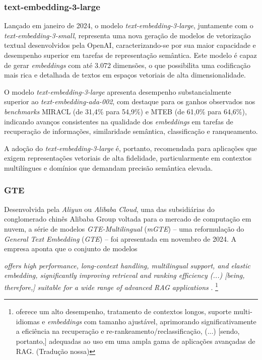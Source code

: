 \subsubsection{text-embedding-3-large}
\label{subsubsec:Metodologia.2.1.3}

Lançado em janeiro de 2024, o modelo \textit{text-embedding-3-large}, juntamente com o \textit{text-embedding-3-small}, representa uma nova geração de modelos de vetorização textual desenvolvidos pela OpenAI, caracterizando-se por sua maior capacidade e desempenho superior em tarefas de representação semântica. Este modelo é capaz de gerar \textit{embeddings} com até 3.072 dimensões, o que possibilita uma codificação mais rica e detalhada de textos em espaços vetoriais de alta dimensionalidade.

O modelo \textit{text-embedding-3-large} apresenta desempenho substancialmente superior ao \textit{text-embedding-ada-002}, com destaque para os ganhos observados nos \textit{benchmarks} MIRACL (de 31,4\% para 54,9\%) e MTEB (de 61,0\% para 64,6\%), indicando avanços consistentes na qualidade dos \textit{embeddings} em tarefas de recuperação de informações, similaridade semântica, classificação e ranqueamento.

A adoção do \textit{text-embedding-3-large} é, portanto, recomendada para aplicações que exigem representações vetoriais de alta fidelidade, particularmente em contextos multilíngues e domínios que demandam precisão semântica elevada.


\subsubsection{GTE}
\label{subsubsec:Metodologia.2.1.4}
Desenvolvida pela \textit{Aliyun} ou \textit{Alibaba Cloud}, uma das subsidiárias do conglomerado chinês Alibaba Group voltada para o mercado de computação em nuvem, a série de modelos \textit{GTE-Multilingual} (\textit{mGTE}) -- uma reformulação do \textit{General Text Embedding} (\textit{GTE}) -- foi apresentada em novembro de 2024. A empresa aponta que o conjunto de modelos

\begin{citacao}
    \textit{offers high performance, long-context handling, multilingual support, and elastic embedding, significantly improving retrieval and ranking efficiency (...) [being, therefore,] suitable for a wide range of advanced \ac{RAG} applications} \cite{GTE:1}.
    \footnote{oferece um alto desempenho, tratamento de contextos longos, suporte multi-idiomas e \textit{embeddings} com tamanho ajustável, aprimorando significativamente a eficiência na recuperação e re-rankeamento/reclassificação, (...) [sendo, portanto,] adequadas ao uso em uma ampla gama de aplicações avançadas de \ac{RAG}. (Tradução nossa)}
\end{citacao}

